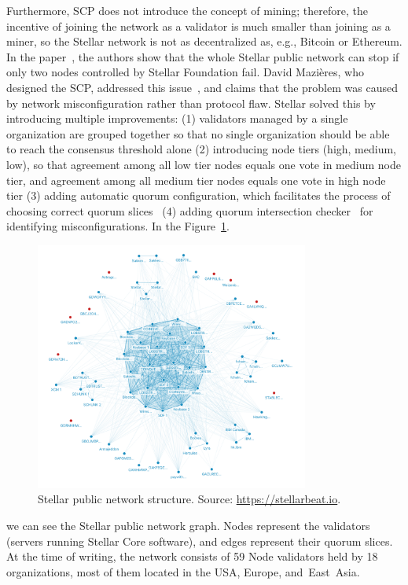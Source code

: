 \documentclass[applsci,article,accept,moreauthors,pdftex]{Definitions/mdpi}
\begin{document}
Furthermore, SCP does not introduce the concept of mining; therefore, the incentive of joining the network as a validator is much smaller than joining as a miner, so the Stellar network is not as decentralized as, e.g., Bitcoin or Ethereum. In the paper~\cite{kim2019Stellar}, the authors show that the whole Stellar public network can stop if only two nodes controlled by Stellar Foundation fail. David Mazières, who designed the SCP, addressed this issue~\cite{Safetyvs90:online}, and claims that the problem was caused by network misconfiguration rather than protocol flaw. Stellar solved this by introducing multiple improvements: (1) validators managed by a single organization are grouped together so that no single organization should be able to reach the consensus threshold alone (2) introducing node tiers (high, medium, low), so that agreement among all low tier nodes equals one vote in medium node tier, and agreement among all medium tier nodes equals one vote in high node tier (3) adding automatic quorum configuration, which facilitates the process of choosing correct quorum slices~\cite{WhyQuoru96:online} (4) adding quorum intersection checker~\cite{DBLP:journals/corr/abs-1902-06493} for identifying misconfigurations. In the Figure~\ref{fig:network-viz}.
\begin{figure}[H]

\centering\includegraphics[width=9cm]{figs/Stellar-network-viz.png}
\caption{Stellar public network structure. Source: \url{https://stellarbeat.io}.}
\label{fig:network-viz}
\end{figure} 
we can see the Stellar public network graph. Nodes represent the validators (servers running Stellar Core software), and edges represent their quorum slices. At the time of writing, the network consists of 59 Node validators held by 18 organizations, most of them located in the USA, Europe, and~East~Asia.
\end{document}
